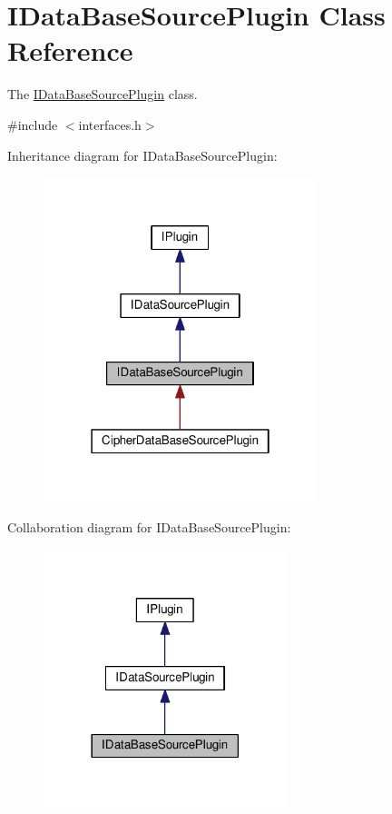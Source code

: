 \hypertarget{class_i_data_base_source_plugin}{}\section{I\+Data\+Base\+Source\+Plugin Class Reference}
\label{class_i_data_base_source_plugin}


The \hyperlink{class_i_data_base_source_plugin}{I\+Data\+Base\+Source\+Plugin} class.  




{\ttfamily \#include $<$interfaces.\+h$>$}



Inheritance diagram for I\+Data\+Base\+Source\+Plugin\+:\nopagebreak
\begin{figure}[H]
\begin{center}
\leavevmode
\includegraphics[width=226pt]{class_i_data_base_source_plugin__inherit__graph}
\end{center}
\end{figure}


Collaboration diagram for I\+Data\+Base\+Source\+Plugin\+:\nopagebreak
\begin{figure}[H]
\begin{center}
\leavevmode
\includegraphics[width=201pt]{class_i_data_base_source_plugin__coll__graph}
\end{center}
\end{figure}
